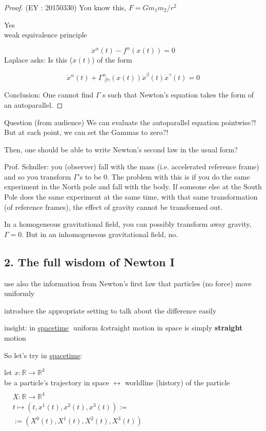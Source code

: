 \documentclass[10pt]{amsart}
\begin{document}
\begin{multicols*}{2}
\begin{proof}
		(EY : 20150330) You know this, $F=Gm_1m_2/r^2$
		
		Yes \\ 
		weak equivalence principle
		
		\[
		\ddot{x}^{\alpha}(t) - f^{\alpha}(x(t)) = 0 
		\]
		Laplace asks: Is this ($\ddot{x}(t)$) of the form 
		
		\[
		\ddot{x}^{\alpha}(t) + \Gamma^{\alpha}_{\, \, \beta \gamma}(x(t)) \dot{x}^{\beta}(t) \dot{x}^{\gamma}(t) = 0 
		\]
		
		Conclusion: One cannot find $\Gamma$ s such that Newton's equation takes the form of an autoparallel.
		
	\end{proof}
	
	Question (from audience) We can evaluate the autoparallel equation pointwise?! But at each point, we can set the Gammas to zero?!
	
	Then, one should be able to write Newton's second law in the usual form?
	
	Prof. Schuller: you (observer) fall with the mass (i.e. accelerated reference frame) and so you transform $\Gamma$'s to be $0$.  The problem with this is if you do the same experiment in the North pole and fall with the body.  If someone else at the South Pole does the same experiment at the same time, with that same transformation (of reference frames), the effect of gravity cannot be transformed out.
	
	In a homogeneous gravitational field, you can possibly transform away gravity, $\Gamma=0$.  But in an inhomogeneous gravitational field, no.
	
	\subsection*{2. The full wisdom of Newton I}
	
	use also the information from Newton's first law that particles (no force) move uniformly 
	
	introduce the appropriate setting to talk about the difference easily
	
	insight: in \underline{spacetime} $\boxed{ \text{ uniform \& straight motion in space}}$ is simply \textbf{straight} motion
	
	So let's try in \underline{spacetime}: 
	
	let $x: \mathbb{R} \to \mathbb{R}^3$ \\
	\phantom{\quad } be a particle's trajectory in space $\longleftrightarrow $ worldline (history) of the particle $\begin{aligned} & \quad \\
	& X : \mathbb{R} \to \mathbb{R}^4  \\
	& t\mapsto (t, x^1(t), x^2(t),x^3(t)) := \\
	& := (X^0(t), X^1(t),X^2(t),X^3(t)) \end{aligned}$
	

\end{multicols*}
\end{document}
